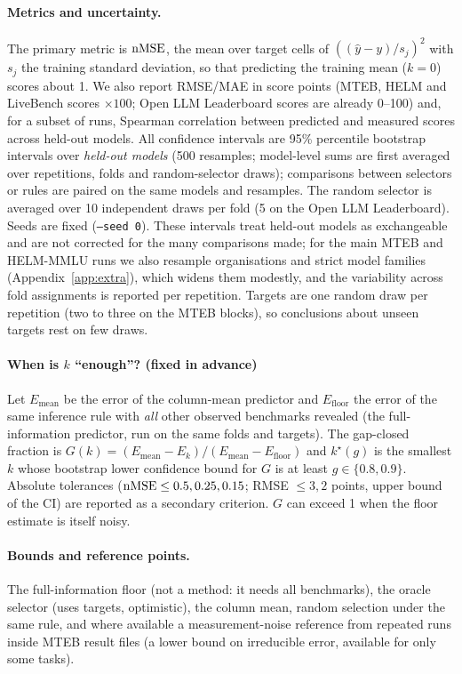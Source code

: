 \paragraph{Metrics and uncertainty.}
The primary metric is $\mathrm{nMSE}$, the mean over target cells of $((\hat y-y)/s_j)^2$ with $s_j$ the training standard deviation, so that predicting the training mean ($k=0$) scores about 1. We also report RMSE/MAE in score points (MTEB, HELM and LiveBench scores $\times100$; Open LLM Leaderboard scores are already 0--100) and, for a subset of runs, Spearman correlation between predicted and measured scores across held-out models. All confidence intervals are 95\% percentile bootstrap intervals over \emph{held-out models} (500 resamples; model-level sums are first averaged over repetitions, folds and random-selector draws); comparisons between selectors or rules are paired on the same models and resamples. The random selector is averaged over 10 independent draws per fold (5 on the Open LLM Leaderboard). Seeds are fixed (\texttt{--seed 0}). These intervals treat held-out models as exchangeable and are not corrected for the many comparisons made; for the main MTEB and HELM-MMLU runs we also resample organisations and strict model families (Appendix~\ref{app:extra}), which widens them modestly, and the variability across fold assignments is reported per repetition. Targets are one random draw per repetition (two to three on the MTEB blocks), so conclusions about unseen targets rest on few draws.

\paragraph{When is $k$ ``enough''? (fixed in advance)}
Let $E_{\mathrm{mean}}$ be the error of the column-mean predictor and $E_{\mathrm{floor}}$ the error of the same inference rule with \emph{all} other observed benchmarks revealed (the full-information predictor, run on the same folds and targets). The gap-closed fraction is $G(k)=(E_{\mathrm{mean}}-E_k)/(E_{\mathrm{mean}}-E_{\mathrm{floor}})$ and $k^\star(g)$ is the smallest $k$ whose bootstrap lower confidence bound for $G$ is at least $g\in\{0.8,0.9\}$. Absolute tolerances ($\mathrm{nMSE}\le0.5,0.25,0.15$; RMSE $\le3,2$ points, upper bound of the CI) are reported as a secondary criterion. $G$ can exceed 1 when the floor estimate is itself noisy.

\paragraph{Bounds and reference points.}
The full-information floor (not a method: it needs all benchmarks), the oracle selector (uses targets, optimistic), the column mean, random selection under the same rule, and where available a measurement-noise reference from repeated runs inside MTEB result files (a lower bound on irreducible error, available for only some tasks).
